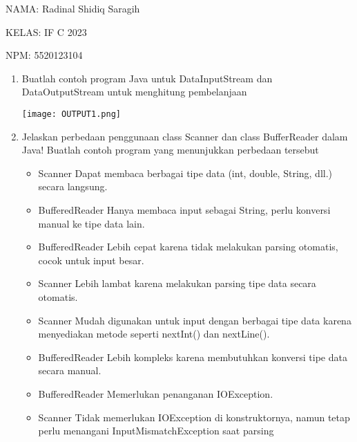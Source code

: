 \documentclass[8pt, a4paper]{article}
\date{}
\newcommand{\lstinputwithcaption}[2]{%
}
\begin{document}
NAMA: Radinal Shidiq Saragih

KELAS: IF C 2023

NPM: 5520123104

\begin{enumerate}
  \item Buatlah contoh program Java untuk DataInputStream dan DataOutputStream untuk menghitung pembelanjaan

  \begin{multicols}{2}

    \lstinputwithcaption{./code/src/pembelanjaan/Main.java}{Main.java}
    \lstinputwithcaption{./code/src/pembelanjaan/Transaksi.java}{Transaksi.java}
  \end{multicols}

      \begin{center}
        \texttt{[image: OUTPUT1.png]}
      \end{center}

  \item Jelaskan perbedaan penggunaan class Scanner dan class BufferReader
    dalam Java! Buatlah contoh program yang menunjukkan perbedaan tersebut

  \begin{itemize}
    \item Scanner Dapat membaca berbagai tipe data (int, double, String, dll.) secara langsung.
    \item BufferedReader Hanya membaca input sebagai String, perlu konversi manual ke tipe data lain.
    \item BufferedReader Lebih cepat karena tidak melakukan parsing otomatis, cocok untuk input besar.
    \item Scanner Lebih lambat karena melakukan parsing tipe data secara otomatis.
    \item Scanner Mudah digunakan untuk input dengan berbagai tipe data karena menyediakan metode seperti nextInt() dan nextLine().
    \item BufferedReader Lebih kompleks karena membutuhkan konversi tipe data secara manual.
    \item BufferedReader Memerlukan penanganan IOException.
    \item Scanner Tidak memerlukan IOException di konstruktornya, namun tetap perlu menangani InputMismatchException saat parsing
  \end{itemize}

    \lstinputwithcaption{./code/src/perbedaan\_input/Main.java}{Main.java}
    

\end{enumerate}
\end{document}
